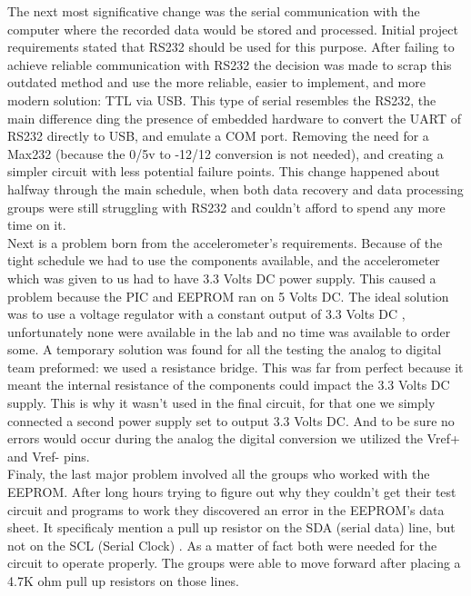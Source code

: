 \documentclass[12pt]{article}
\begin{document}
	The next most significative change was the serial communication with the computer where the recorded data would be stored and processed. Initial project requirements stated that RS232 should be used for this purpose. After failing to achieve reliable communication with RS232 the decision was made to scrap this outdated method and use the more reliable, easier to implement, and more modern solution: TTL via USB. This type of serial resembles the RS232, the main difference ding the presence of embedded hardware to convert the UART of RS232 directly to USB, and emulate a COM port. Removing the need for a Max232 (because the 0/5v to -12/12 conversion is not needed), and creating a simpler circuit with less potential failure points. This change happened about halfway through the main schedule, when both data recovery and data processing groups were still struggling with RS232 and couldn’t afford to spend any more time on it.\\

	Next is a problem born from the accelerometer’s requirements. Because of the tight schedule we had to use the components available, and the accelerometer which was given to us had to have 3.3 Volts DC power supply. This caused a problem because the PIC and EEPROM ran on 5 Volts DC. The ideal solution was to use a voltage regulator with a constant output of 3.3 Volts DC \cite{Acc}, unfortunately none were available in the lab and no time was available to order some. A temporary solution was found for all the testing the analog to digital team preformed: we used a resistance bridge. This was far from perfect because it meant the internal resistance of the components could impact the 3.3 Volts DC supply. This is why it wasn’t used in the final circuit, for that one we simply connected a second power supply set to output 3.3 Volts DC. And to be sure no errors would occur during the analog the digital conversion we utilized the Vref+ and Vref- pins.\\

	Finaly, the last major problem involved all the groups who worked with the EEPROM. After long hours trying to figure out why they couldn’t get their test circuit and programs to work they discovered an error in the EEPROM’s data sheet. It specificaly mention a pull up resistor on the SDA (serial data)  line, but not on the SCL (Serial Clock) \cite{EEPROM}. As a matter of fact both were needed for the circuit to operate properly. The groups were able to move forward after placing a 4.7K ohm pull up resistors on those lines.\\
\end{document}

